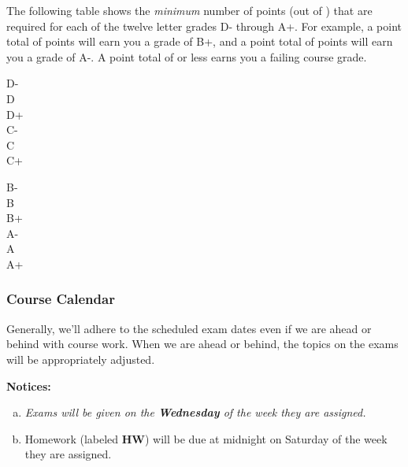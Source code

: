 \documentclass[12pt]{article}
\newcounter{ex}\setcounter{ex}{0}
\newenvironment{mypar}[2]
  {\begin{list}{}%
    {\setlength\leftmargin{#1}
    \setlength\rightmargin{#2}}
    \item[]}
  {\end{list}}
\newenvironment{alphalist}{
  \begin{enumerate}[(a)]
    \addtolength{\itemsep}{-0.5\itemsep}}
  {\end{enumerate}}
\begin{document}
The following table shows the \emph{minimum} number of points (out of \points) that
are required for each of the twelve letter grades D- through A+. For
example, a point total of \Bp\/  points will earn you a grade of B+,  and 
a point total of \Am\/ points will earn you a grade of A-. A point
total of \F\/  or less earns you a failing course grade.
 
 \vspace{0.1in}
     \begin{minipage}{5.5in}
  \centering 
\begin{mypar}{0.25in}{0.25in}
    \begin{minipage}{2.5in}
        D-  \dotfill \Dm \\
        D \dotfill \D \\
        D+ \dotfill \Dp \\
        C- \dotfill \Cm  \\
        C \dotfill \C \\
        C+ \dotfill \Cp 
        \end{minipage}
    \phantom{xxx}
    \begin{minipage}{2.5in}
        B- \dotfill \Bm \\
        B \dotfill  \B \\
        B+ \dotfill  \Bp\\
        A- \dotfill  \Am \\
        A \dotfill  \A \\
        A+ \dotfill  \Ap
    \end{minipage}
\end{mypar} 
\end{minipage}

\subsubsection*{Course Calendar}

Generally, we'll adhere to the scheduled exam dates even if we are ahead or behind with course work.  
When we are ahead or behind, the topics on the exams will be appropriately adjusted.  


\vspace{0.1in}
\noindent \textbf{Notices:}


\begin{alphalist}
   \item \emph{Exams will be given on the \textbf{Wednesday} of the week they are assigned.}
   

    \item Homework (labeled \textbf{HW}) will be due at midnight on   Saturday of the week they are assigned.  


\end{alphalist}
\end{document}
